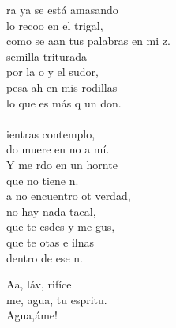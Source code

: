 \documentclass[12pt]{article}
\begin{document}
\begin{multicols*}{2}
\begin{cancion}
	ra ya se está amasando \\
	lo recoo en el trigal, \\
	como se aan tus palabras 
	en mi z. \\
	 semilla triturada \\
	por la o y el sudor, \\
	pesa ah en mis rodillas\\
	lo que es más q un don.\\
{}\vspace*{-0.4cm}\\
	ientras  contemplo, \\
	do muere en no a mí.\\
	Y me rdo en un hornte \\
	que no tiene n. \\
	a no encuentro ot verdad,\\
	 no hay nada taeal,\\
	que te esdes y me gus,\\
	que te otas e ilnas\\
	dentro de ese n.\\
\end{cancion}%

\begin{cancion}%
	Aa, láv, rifíce\\
	me, agua, tu espritu.\\
	Agua,áme!\\
\end{cancion}%

\siguientecolumna


\end{multicols*}
\end{document}
